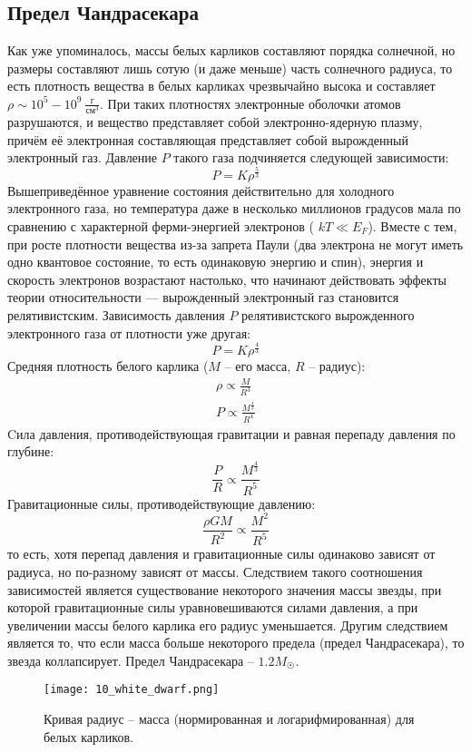 \subsection{Предел Чандрасекара}
Как уже упоминалось, массы белых карликов составляют порядка солнечной, но размеры составляют лишь сотую (и даже меньше) часть солнечного радиуса, то есть плотность вещества в белых карликах чрезвычайно высока и составляет $\rho \sim 10^{5}-10^{9} \ \frac{\text{г}}{\text{см}^{3}} $. При таких плотностях электронные оболочки атомов разрушаются, и вещество представляет собой электронно-ядерную плазму, причём её электронная составляющая представляет собой вырожденный электронный газ. Давление $P$ такого газа подчиняется следующей зависимости:
\begin{equation*}
    P = K\rho^{\frac{5}{3}}
\end{equation*}
Вышеприведённое уравнение состояния действительно для холодного электронного газа, но температура даже в несколько миллионов градусов мала по сравнению с характерной ферми-энергией электронов (
$kT\ll E_{F}$). Вместе с тем, при росте плотности вещества из-за запрета Паули (два электрона не могут иметь одно квантовое состояние, то есть одинаковую энергию и спин), энергия и скорость электронов возрастают настолько, что начинают действовать эффекты теории относительности — вырожденный электронный газ становится релятивистским. Зависимость давления $P$ релятивистского вырожденного электронного газа от плотности уже другая:
\begin{equation*}
    P = K\rho^{\frac{4}{3}}
\end{equation*}
Средняя плотность белого карлика ($M$ -- его масса, $R$ -- радиус):
\begin{gather*}
    \rho \propto \frac{M}{R^{3}}\\
    P\propto \frac{M^{\frac{4}{3}}}{R^{4}}
\end{gather*}
Cила давления, противодействующая гравитации и равная перепаду давления по глубине:
\begin{equation*}
    \frac{P}{R}\propto \frac{M^{\frac{4}{3}}}{R^{5}}
\end{equation*}
Гравитационные силы, противодействующие давлению:
\begin{equation*}
    \frac{\rho G M}{R^{2}} \propto \frac{M^{2}}{R^{5}}
\end{equation*}
то есть, хотя перепад давления и гравитационные силы одинаково зависят от радиуса, но по-разному зависят от массы. Следствием такого соотношения зависимостей является существование некоторого значения массы звезды, при которой гравитационные силы уравновешиваются силами давления, а при увеличении массы белого карлика его радиус уменьшается. Другим следствием является то, что если масса больше некоторого предела (предел Чандрасекара), то звезда коллапсирует. Предел Чандрасекара -- $1.2M_{\Sun}$. 
\begin{figure}[H]
    \centering
    \texttt{[image: 10\_white\_dwarf.png]}
    \caption{Кривая радиус -- масса (нормированная и логарифмированная) для белых карликов.}
    \label{fig:wd}
\end{figure}

